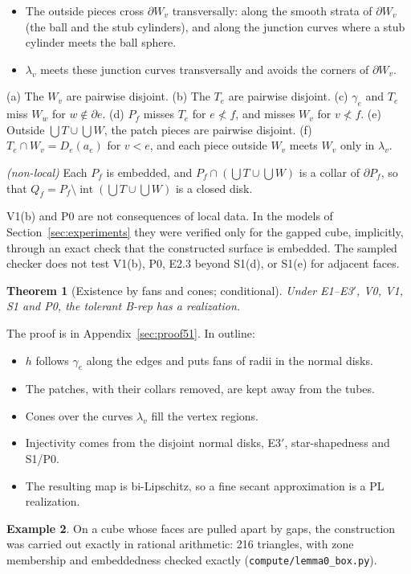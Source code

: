 \documentclass[preprint,12pt]{elsarticle}
\newtheorem{theorem}{Theorem}[section]
\theoremstyle{definition}
\newtheorem{example}[theorem]{Example}
\theoremstyle{remark}
\newcommand{\inter}{\operatorname{int}}
\begin{document}
\begin{description}
\begin{itemize}
\item The outside pieces cross $\partial W_v$ transversally: along the smooth strata of $\partial W_v$ (the ball and the
stub cylinders), and along the junction curves where a stub cylinder meets the ball sphere.
\item $\lambda_v$ meets these junction curves transversally and avoids the corners of $\partial W_v$.
\end{itemize}
\item[S1] (a) The $W_v$ are pairwise disjoint. (b) The $T_e$ are pairwise disjoint. (c) $\gamma_e$ and $T_e$ miss $W_w$
for $w\notin\partial e$. (d) $P_f$ misses $T_e$ for $e\not<f$, and misses $W_v$ for $v\not<f$. (e) Outside
$\bigcup T\cup\bigcup W$, the patch pieces are pairwise disjoint. (f) $T_e\cap W_v=D_e(a_e)$ for $v<e$, and each
piece outside $W_v$ meets $W_v$ only in $\lambda_v$.
\item[P0] \emph{(non-local)} Each $P_f$ is embedded, and $P_f\cap(\bigcup T\cup\bigcup W)$ is a collar of $\partial
P_f$, so that $Q_f=P_f\setminus\inter(\bigcup T\cup\bigcup W)$ is a closed disk.
\end{description}
V1(b) and P0 are not consequences of local data. In the models of Section~\ref{sec:experiments} they were verified
only for the gapped cube, implicitly, through an exact check that the constructed surface is embedded. The
sampled checker does not test V1(b), P0, E2.3 beyond S1(d), or S1(e) for adjacent faces.

\begin{theorem}[Existence by fans and cones; conditional]\label{thm:lemma0}
Under E1--E3$'$, V0, V1, S1 and P0, the tolerant B-rep has a realization.
\end{theorem}
The proof is in Appendix~\ref{sec:proof51}. In outline:
\begin{itemize}
\item $h$ follows $\gamma_e$ along the edges and puts fans of radii in the normal disks.
\item The patches, with their collars removed, are kept away from the tubes.
\item Cones over the curves $\lambda_v$ fill the vertex regions.
\item Injectivity comes from the disjoint normal disks, E3$'$, star-shapedness and S1/P0.
\item The resulting map is bi-Lipschitz, so a fine secant approximation is a PL realization.
\end{itemize}

\begin{example}
On a cube whose faces are pulled apart by gaps, the construction was carried out exactly in rational
arithmetic: 216 triangles, with zone membership and embeddedness checked exactly
(\texttt{compute/lemma0\_box.py}).
\end{example}
\end{document}
